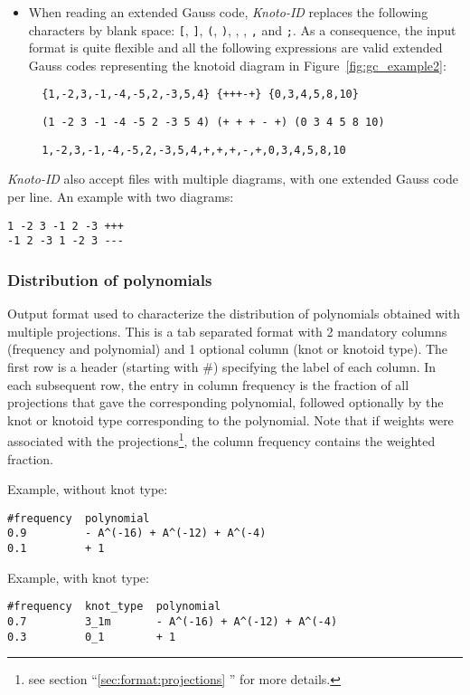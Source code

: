 \begin{itemize}
\item When reading an extended Gauss code, {\it Knoto-ID} replaces the following characters by blank space: \lstinline{[}, \lstinline{]}, \lstinline{(}, \lstinline{)}, \lstinlineT{\{}, \lstinlineT{\}}, \lstinline{,} and \lstinline{;}. As a consequence, the input format is quite flexible and all the following expressions are valid extended Gauss codes representing the knotoid diagram in  Figure~\ref{fig:gc_example2}:
\begin{lstlisting}
  {1,-2,3,-1,-4,-5,2,-3,5,4} {+++-+} {0,3,4,5,8,10}
\end{lstlisting}
\begin{lstlisting}
  (1 -2 3 -1 -4 -5 2 -3 5 4) (+ + + - +) (0 3 4 5 8 10)
\end{lstlisting}
\begin{lstlisting}
  1,-2,3,-1,-4,-5,2,-3,5,4,+,+,+,-,+,0,3,4,5,8,10
\end{lstlisting}
\end{itemize}

{\it Knoto-ID} also accept files with multiple diagrams, with one extended Gauss code per line. An example with two diagrams:
\begin{lstlisting}
1 -2 3 -1 2 -3 +++  
-1 2 -3 1 -2 3 ---
\end{lstlisting}



\subsubsection{\label{sec:format:multiprojection:jones}Distribution of polynomials}
Output format used to characterize the distribution of polynomials obtained with multiple projections. This is a tab separated format with 2 mandatory columns (frequency and polynomial) and 1 optional column (knot or knotoid type).
The first row is a header (starting with \#) specifying the label of each column.
In each subsequent row, the entry in column frequency is the fraction of all projections that gave the corresponding polynomial, followed optionally by the knot or knotoid type corresponding to the polynomial. Note that if weights were associated with the projections\footnote{see section ``\ref{sec:format:projections} '' for more details.}, the column frequency contains the weighted fraction.

Example, without knot type:
\begin{lstlisting}
#frequency  polynomial
0.9         - A^(-16) + A^(-12) + A^(-4)
0.1         + 1
\end{lstlisting}
Example, with knot type:
\begin{lstlisting}
#frequency  knot_type  polynomial
0.7         3_1m       - A^(-16) + A^(-12) + A^(-4)
0.3         0_1        + 1
\end{lstlisting}



